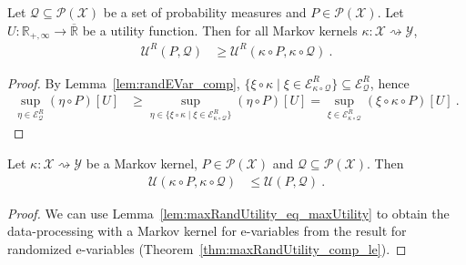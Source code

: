 \begin{theorem}\label{thm:maxRandUtility_comp_le}
  \leanok
Let $\mathcal{Q} \subseteq \mathcal{P}(\mathcal{X})$ be a set of probability measures and $P \in \mathcal{P}(\mathcal{X})$.
Let $U : \mathbb{R}_{+,\infty} \to \overline{\mathbb{R}}$ be a utility function.
Then for all Markov kernels $\kappa : \mathcal{X} \rightsquigarrow \mathcal{Y}$,
\begin{align*}
  \mathcal{U}^R(P, \mathcal{Q})
  &\ge \mathcal{U}^R(\kappa \circ P, \kappa \circ \mathcal{Q})
  \: .
\end{align*}
\end{theorem}

\begin{proof}\leanok
By Lemma~\ref{lem:randEVar_comp}, $\{\xi \circ \kappa \mid \xi \in \mathcal{E}^R_{\kappa \circ \mathcal{Q}}\} \subseteq \mathcal{E}^R_{\mathcal{Q}}$, hence
\begin{align*}
  \sup_{\eta \in \mathcal{E}^R_{\mathcal{Q}}} (\eta \circ P)[U]
  &\ge \sup_{\eta \in \{\xi \circ \kappa \mid \xi \in \mathcal{E}^R_{\kappa \circ \mathcal{Q}}\}} (\eta \circ P)[U]
  = \sup_{\xi \in \mathcal{E}^R_{\kappa \circ \mathcal{Q}}} (\xi \circ \kappa \circ P)[U]
  \: .
\end{align*}
\end{proof}


\begin{lemma}\label{lem:maxUtility_comp_le}
  \leanok
Let $\kappa : \mathcal{X} \rightsquigarrow \mathcal{Y}$ be a Markov kernel, $P \in \mathcal{P}(\mathcal{X})$ and $\mathcal{Q} \subseteq \mathcal{P}(\mathcal{X})$.
Then
\begin{align*}
  \mathcal{U}(\kappa \circ P, \kappa \circ \mathcal{Q})
  &\le \mathcal{U}(P, \mathcal{Q})
  \: .
\end{align*}
\end{lemma}

\begin{proof}\leanok
We can use Lemma~\ref{lem:maxRandUtility_eq_maxUtility} to obtain the data-processing with a Markov kernel for e-variables from the result for randomized e-variables (Theorem~\ref{thm:maxRandUtility_comp_le}).
\end{proof}


